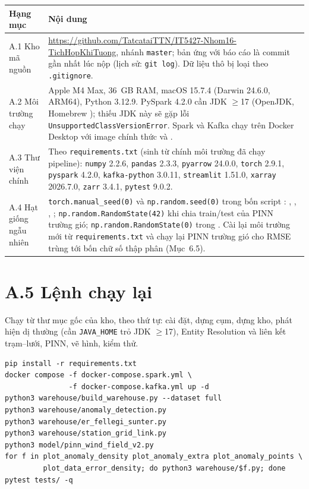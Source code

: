 \documentclass[12pt,a4paper]{report}
\begin{document}
{\footnotesize
\begin{longtable}{@{}L{2.9cm}L{12.1cm}@{}}
\toprule
\textbf{Hạng mục} & \textbf{Nội dung} \\
\midrule
\endhead
A.1 Kho mã nguồn & \url{https://github.com/TatcataiTTN/IT5427-Nhom16-TichHopKhiTuong}, nhánh \texttt{master};
bản ứng với báo cáo là commit gần nhất lúc nộp (lịch sử: \texttt{git log}). Dữ liệu thô bị loại theo
\texttt{.gitignore}. \\
A.2 Môi trường chạy & Apple M4 Max, 36~GB RAM, macOS 15.7.4 (Darwin 24.6.0, ARM64), Python 3.12.9.
PySpark 4.2.0 cần JDK $\geq$17 (OpenJDK, Homebrew ); thiếu JDK này sẽ gặp lỗi
\texttt{UnsupportedClassVersionError}. Spark và Kafka chạy trên Docker Desktop với image chính thức
 và . \\
A.3 Thư viện chính & Theo \texttt{requirements.txt} (sinh từ chính môi trường đã chạy pipeline):
\texttt{numpy} 2.2.6, \texttt{pandas} 2.3.3, \texttt{pyarrow} 24.0.0, \texttt{torch} 2.9.1,
\texttt{pyspark} 4.2.0, \texttt{kafka-python} 3.0.11, \texttt{streamlit} 1.51.0, \texttt{xarray}
2026.7.0, \texttt{zarr} 3.4.1, \texttt{pytest} 9.0.2. \\
A.4 Hạt giống ngẫu nhiên & \texttt{torch.manual\_seed(0)} và \texttt{np.random.seed(0)} trong bốn script
: , , ,
; \texttt{np.random.RandomState(42)} khi chia train/test của PINN
trường gió; \texttt{np.random.RandomState(0)} trong . Cài lại môi trường mới
từ \texttt{requirements.txt} và chạy lại PINN trường gió cho RMSE trùng tới bốn chữ số thập phân
(Mục~6.5). \\
\bottomrule
\end{longtable}
}

\section*{A.5 Lệnh chạy lại}

Chạy từ thư mục gốc của kho, theo thứ tự: cài đặt, dựng cụm, dựng kho, phát hiện dị thường (cần
\texttt{JAVA\_HOME} trỏ JDK $\geq$17), Entity Resolution và liên kết trạm--lưới, PINN, vẽ hình, kiểm thử.
{\footnotesize
\begin{verbatim}
pip install -r requirements.txt
docker compose -f docker-compose.spark.yml \
               -f docker-compose.kafka.yml up -d
python3 warehouse/build_warehouse.py --dataset full
python3 warehouse/anomaly_detection.py
python3 warehouse/er_fellegi_sunter.py
python3 warehouse/station_grid_link.py
python3 model/pinn_wind_field_v2.py
for f in plot_anomaly_density plot_anomaly_extra plot_anomaly_points \
         plot_data_error_density; do python3 warehouse/$f.py; done
pytest tests/ -q
\end{verbatim}
}
\end{document}

